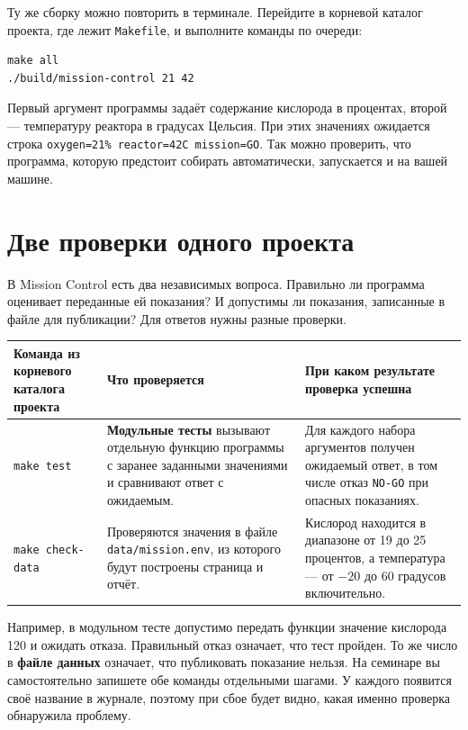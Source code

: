 Ту же сборку можно повторить в терминале. Перейдите в корневой каталог проекта, где лежит \texttt{Makefile}, и выполните команды по очереди:

\begin{verbatim}
make all
./build/mission-control 21 42
\end{verbatim}

Первый аргумент программы задаёт содержание кислорода в процентах, второй — температуру реактора в градусах Цельсия. При этих значениях ожидается строка \texttt{oxygen=21\% reactor=42C mission=GO}. Так можно проверить, что программа, которую предстоит собирать автоматически, запускается и на вашей машине.

\section{Две проверки одного проекта}

В Mission Control есть два независимых вопроса. Правильно ли программа оценивает переданные ей показания? И допустимы ли показания, записанные в файле для публикации? Для ответов нужны разные проверки.

\begin{longtable}{>{\raggedright\arraybackslash}p{}>{\raggedright\arraybackslash}p{}>{\raggedright\arraybackslash}p{}}
\toprule
Команда из корневого каталога проекта & Что проверяется & При каком результате проверка успешна \\
\midrule
\endhead
\texttt{make test} & \textbf{Модульные тесты} вызывают отдельную функцию программы с заранее заданными значениями и сравнивают ответ с ожидаемым. & Для каждого набора аргументов получен ожидаемый ответ, в том числе отказ \texttt{NO-GO} при опасных показаниях. \\
\texttt{make check-data} & Проверяются значения в файле \texttt{data/mission.env}, из которого будут построены страница и отчёт. & Кислород находится в диапазоне от 19 до 25 процентов, а температура — от \(-20\) до 60 градусов включительно. \\
\bottomrule
\end{longtable}

Например, в модульном тесте допустимо передать функции значение кислорода 120 и ожидать отказа. Правильный отказ означает, что тест пройден. То же число в \textbf{файле данных} означает, что публиковать показание нельзя. На семинаре вы самостоятельно запишете обе команды отдельными шагами. У каждого появится своё название в журнале, поэтому при сбое будет видно, какая именно проверка обнаружила проблему.

